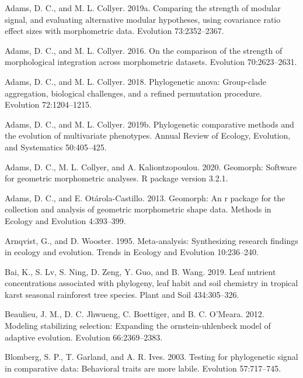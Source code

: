 \documentclass[
]{article}
\begin{document}
\leavevmode\hypertarget{ref-AdamsCollyer2019b}{}%
Adams, D. C., and M. L. Collyer. 2019a. Comparing the strength of
modular signal, and evaluating alternative modular hypotheses, using
covariance ratio effect sizes with morphometric data. Evolution
73:2352--2367.

\leavevmode\hypertarget{ref-AdamsCollyer2016}{}%
Adams, D. C., and M. L. Collyer. 2016. On the comparison of the strength
of morphological integration across morphometric datasets. Evolution
70:2623--2631.

\leavevmode\hypertarget{ref-AdamsCollyer2018b}{}%
Adams, D. C., and M. L. Collyer. 2018. Phylogenetic anova: Group-clade
aggregation, biological challenges, and a refined permutation procedure.
Evolution 72:1204--1215.

\leavevmode\hypertarget{ref-AdamsCollyer2019}{}%
Adams, D. C., and M. L. Collyer. 2019b. Phylogenetic comparative methods
and the evolution of multivariate phenotypes. Annual Review of Ecology,
Evolution, and Systematics 50:405--425.

\leavevmode\hypertarget{ref-AdamsGeomorph}{}%
Adams, D. C., M. L. Collyer, and A. Kaliontzopoulou. 2020. Geomorph:
Software for geometric morphometric analyses. R package version 3.2.1.

\leavevmode\hypertarget{ref-AdamsOtarola2013}{}%
Adams, D. C., and E. Otárola-Castillo. 2013. Geomorph: An r package for
the collection and analysis of geometric morphometric shape data.
Methods in Ecology and Evolution 4:393--399.

\leavevmode\hypertarget{ref-Arnqvist1995}{}%
Arnqvist, G., and D. Wooster. 1995. Meta-analysis: Synthesizing research
findings in ecology and evolution. Trends in Ecology and Evolution
10:236--240.

\leavevmode\hypertarget{ref-Bai2019}{}%
Bai, K., S. Lv, S. Ning, D. Zeng, Y. Guo, and B. Wang. 2019. Leaf
nutrient concentrations associated with phylogeny, leaf habit and soil
chemistry in tropical karst seasonal rainforest tree species. Plant and
Soil 434:305--326.

\leavevmode\hypertarget{ref-Beaulieu_et_al2012}{}%
Beaulieu, J. M., D. C. Jhwueng, C. Boettiger, and B. C. O'Meara. 2012.
Modeling stabilizing selection: Expanding the ornstein-uhlenbeck model
of adaptive evolution. Evolution 66:2369--2383.

\leavevmode\hypertarget{ref-Blomberg_et_al2003}{}%
Blomberg, S. P., T. Garland, and A. R. Ives. 2003. Testing for
phylogenetic signal in comparative data: Behavioral traits are more
labile. Evolution 57:717--745.
\end{document}
